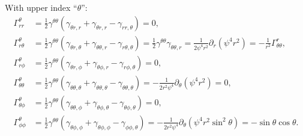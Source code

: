 \documentclass[aps,prd,preprint]{revtex4-1}
\begin{document}
With upper index ``$\theta$'':
\begin{align}
%
%
\Gamma^\theta_{rr} & = \frac{1}{2} \gamma^{\theta \theta} \left(
  \gamma_{\theta r,r} + \gamma_{\theta r,r} - \gamma_{rr,\theta} \right) = 0, \\
%
%
\Gamma^\theta_{r \theta} & = \frac{1}{2} \gamma^{\theta\theta} \left(
  \gamma_{\theta r, \theta} + \gamma_{\theta \theta, r} - \gamma_{r \theta, \theta} \right) =
\frac{1}{2} \gamma^{\theta\theta} \gamma_{\theta \theta, r} =
\frac{1}{2 \psi^4 r^2} \partial_r \left( \psi^4 r^2 \right) =
-\frac{1}{r^2} \Gamma^r_{\theta \theta}, \\
%
%
\Gamma^\theta_{r \phi} & =
  \frac{1}{2} \gamma^{\theta \theta} \left(
    \gamma_{\theta r, \phi} + \gamma_{\theta \phi, r} - \gamma_{r \phi, \theta} \right) = 0, \\
%
%
\Gamma^\theta_{\theta \theta} & =
  \frac{1}{2} \gamma^{\theta \theta} \left(
    \gamma_{\theta \theta, \theta} + \gamma_{\theta \theta, \theta} - \gamma_{\theta \theta, \theta} \right) =
-\frac{1}{2 r^2 \psi^4} \partial_\theta \left( \psi^4 r^2 \right) = 0, \\
%
%
\Gamma^\theta_{\theta \phi} & =
  \frac{1}{2} \gamma^{\theta \theta} \left(
    \gamma_{\theta \theta, \phi} + \gamma_{\theta \phi, \theta} - \gamma_{\theta \phi, \theta} \right) = 0, \\
%
%
\Gamma^\theta_{\phi \phi} & =
  \frac{1}{2} \gamma^{\theta \theta} \left(
    \gamma_{\theta \phi, \phi} + \gamma_{\theta \phi, \phi} - \gamma_{\phi \phi, \theta} \right) =
-\frac{1}{2 r^2 \psi^4} \partial_\theta \left( \psi^4 r^2 \sin^2\theta \right) = - \sin \theta \cos \theta.
\end{align}
\end{document}
